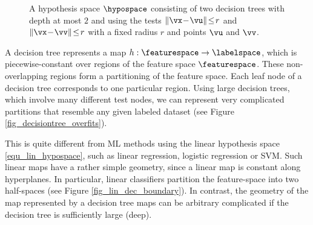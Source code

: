 \documentclass[12pt]{report}
\begin{document}
\begin{figure}[htbp]
\begin{center}
\begin{minipage}{.4\textwidth}
\end{minipage}
\hspace*{3mm}
\begin{minipage}{.4\textwidth}
      \end{minipage}
 \end{center}
 \caption{A hypothesis space $\hypospace$ consisting of two decision trees 
 	with depth at most $2$ and using the tests $\| \vx\!-\!\vu \|\!\leq\!r$ and $\|\vx\!-\!\vv \|\!\leq\!r$ 
 	with a fixed radius $r$ and points $\vu$ and $\vv$. }
 \label{fig_hypospace_DT_depth_2}
\end{figure}

A decision tree represents a map $h: \featurespace \rightarrow \labelspace$, which 
is piecewise-constant over regions of the feature space $\featurespace$. These 
non-overlapping regions form a partitioning of the feature space. Each leaf node of 
a decision tree corresponds to one particular region. Using large decision trees, which 
involve many different test nodes, we can represent very complicated partitions 
that resemble any given labeled dataset (see Figure \ref{fig_decisiontree_overfits}). 

This is quite different from ML methods using the linear hypothesis space \eqref{equ_lin_hypospace}, 
such as linear regression, logistic regression or SVM. Such linear maps have a rather 
simple geometry, since a linear map is constant along hyperplanes. In particular, linear 
classifiers partition the feature-space into two half-spaces (see Figure \ref{fig_lin_dec_boundary}). 
In contrast, the geometry of the map represented by a decision tree maps 
can be arbitrary complicated if the decision tree is sufficiently large (deep). %
\end{document}
